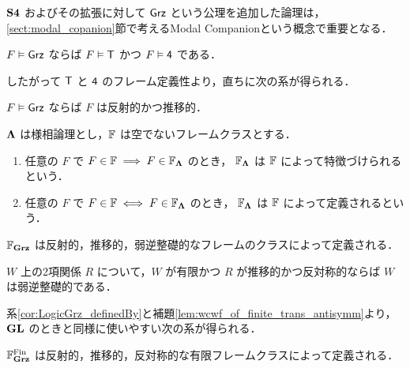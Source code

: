 \documentclass{jlreq}
\begin{document}
\begin{remark}
	$\mathbf{S4}$ およびその拡張に対して $\mathsf{Grz}$ という公理を追加した論理は，
	\ref{sect:modal_copanion}節で考えるModal Companionという概念で重要となる．
\end{remark}

\begin{lemma}
	$F \vDash \mathsf{Grz}$ ならば $F \vDash \mathsf{T}$ かつ $F \vDash \mathsf{4}$ である．
\end{lemma}

したがって $\mathsf{T}$ と $\mathsf{4}$ のフレーム定義性より，直ちに次の系が得られる．

\begin{corollary}
	$F \vDash \mathsf{Grz}$ ならば $F$ は反射的かつ推移的．
\end{corollary}

\begin{definition}
	$\mathbf{\Lambda}$ は様相論理とし，$\mathbb{F}$ は空でないフレームクラスとする．
	\begin{enumerate}
		\item
		      任意の $F$ で $F \in \mathbb{F} \implies F \in \mathbb{F}_{\mathbf{\Lambda}} $ のとき，
		      $\mathbb{F}_{\mathbf{\Lambda}}$ は $\mathbb{F}$ によって特徴づけられるという．
		\item
		      任意の $F$ で $F \in \mathbb{F} \iff F \in \mathbb{F}_{\mathbf{\Lambda}} $ のとき，
		      $\mathbb{F}_{\mathbf{\Lambda}}$ は $\mathbb{F}$ によって定義されるという．
	\end{enumerate}
\end{definition}

\begin{corollary} \label{cor:LogicGrz_definedBy}
	$\mathbb{F}_{\mathbf{Grz}}$ は反射的，推移的，弱逆整礎的なフレームのクラスによって定義される．
\end{corollary}

\begin{lemma}\label{lem:wcwf_of_finite_trans_antisymm}
	$W$ 上の2項関係 $R$ について，$W$ が有限かつ $R$ が推移的かつ反対称的ならば $W$ は弱逆整礎的である．
\end{lemma}

系\ref{cor:LogicGrz_definedBy}と補題\ref{lem:wcwf_of_finite_trans_antisymm}より，$\mathbf{GL}$ のときと同様に使いやすい次の系が得られる．
\begin{corollary}
	$\mathbb{F}^{\mathrm{Fin}}_{\mathbf{Grz}}$ は反射的，推移的，反対称的な有限フレームクラスによって定義される．
\end{corollary}
\end{document}

